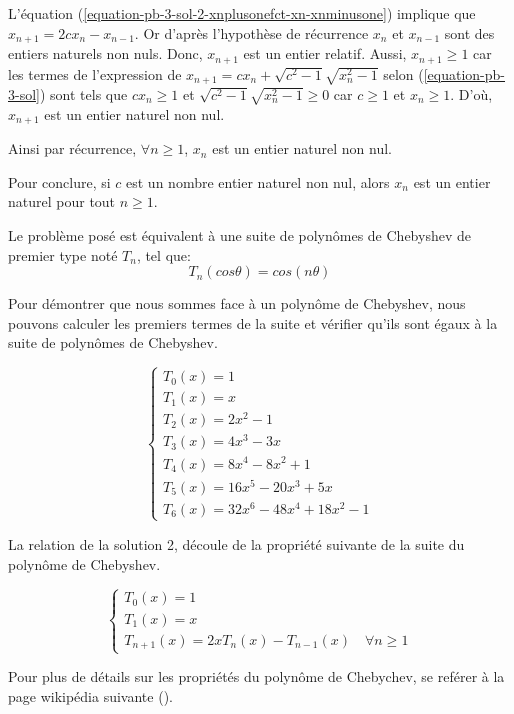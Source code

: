 \documentclass[12pt,a4paper,article]{memoir}
\begin{document}
L'équation (\ref{equation-pb-3-sol-2-xnplusonefct-xn-xnminusone}) implique que $x_{n+1} = 2cx_{n} - x_{n-1}$. Or d'après l'hypothèse de récurrence $x_{n}$ et $x_{n-1}$ sont des entiers naturels non nuls. Donc, $x_{n+1}$ est un entier relatif. Aussi, $x_{n+1} \geq 1$ car les termes de l'expression de $x_{n+1} = cx_{n} + \sqrt{c^2 - 1}\sqrt{x_{n}^2 - 1}$ selon (\ref{equation-pb-3-sol}) sont tels que $cx_{n} \geq 1$ et $\sqrt{c^2 - 1}\sqrt{x_{n}^2 - 1} \geq 0$ car $c \geq 1$ et $x_{n} \geq 1$. D'où, $x_{n+1}$ est un entier naturel non nul.

\bigskip

Ainsi par récurrence, $\forall n \geq 1$, $x_{n}$ est un entier naturel non nul.

\bigskip

Pour conclure, si $c$ est un nombre entier naturel non nul, alors $x_{n}$ est un entier naturel pour tout $n \geq 1$.

\begin{myremark}[colback=red!5!white,colframe=blue!75!black,mytitle={Polynôme de Chebyshev}, label=exfirst]
Le problème posé est équivalent à une suite de polynômes de Chebyshev de premier type noté $T_{n}$, tel que:
\[T_{n}(cos\theta) = cos(n\theta)\]

Pour démontrer que nous sommes face à un polynôme de Chebyshev, nous pouvons calculer les premiers termes de la suite et vérifier qu'ils sont égaux à la suite de polynômes de Chebyshev.

\begin{equation}
\left\{
	\begin{array}{l}
	T_{0}(x) = 1\\
	T_{1}(x) = x\\
	T_{2}(x) = 2x^2 - 1\\
	T_{3}(x) = 4x^{3} - 3x\\
	T_{4}(x) = 8x^{4} - 8x^{2} + 1\\
	T_{5}(x) = 16x^{5} - 20x^{3} + 5x\\
	T_{6}(x) = 32x^{6} - 48x^{4} + 18x^{2} - 1	
	\end{array}
\right.
\label{equation-termes-chebyshev}
\end{equation}

La relation de la solution 2, découle de la propriété suivante de la suite du polynôme de Chebyshev.

\begin{equation}
\left\{
	\begin{array}{l}
	T_{0}(x) = 1\\
	T_{1}(x) = x\\
	T_{n+1}(x) = 2xT_{n}(x) - T_{n-1}(x) \quad \forall n \geq 1
	\end{array}
\right.
\label{equation-relation-chebyshev}
\end{equation}

Pour plus de détails sur les propriétés du polynôme de Chebychev, se reférer à la page wikipédia suivante (\cite{wikicheby}).
\end{myremark}
\end{document}
